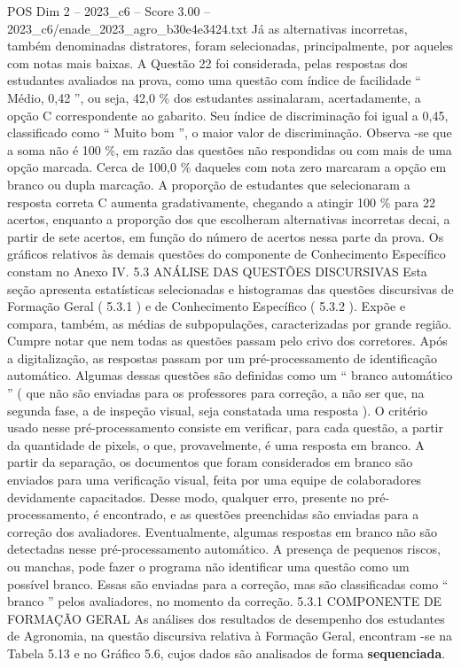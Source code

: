 \begin{textsample}{POS Dim 2 – 2023\_c6 – Score 3.00 – 2023\_c6/enade\_2023\_agro\_b30e4e3424.txt}
Já as alternativas incorretas, também denominadas distratores, foram selecionadas, principalmente, por aqueles com notas mais baixas.
A Questão 22 foi considerada, pelas respostas dos estudantes avaliados na prova, como uma questão com índice de facilidade “ Médio, 0,42 ”, ou seja, 42,0 \% dos estudantes assinalaram, acertadamente, a opção C correspondente ao gabarito.
Seu índice de discriminação foi igual a 0,45, classificado como “ Muito bom ”, o maior valor de discriminação.
Observa -se que a soma não é 100 \%, em razão das questões não respondidas ou com mais de uma opção marcada.
Cerca de 100,0 \% daqueles com nota zero marcaram a opção em branco ou dupla marcação.
A proporção de estudantes que selecionaram a resposta correta C aumenta gradativamente, chegando a atingir 100 \% para 22 acertos, enquanto a proporção dos que escolheram alternativas incorretas decai, a partir de sete acertos, em função do número de acertos nessa parte da prova.
Os gráficos relativos às demais questões do componente de Conhecimento Específico constam no Anexo IV. 5.3 ANÁLISE DAS QUESTÕES DISCURSIVAS Esta seção apresenta estatísticas selecionadas e histogramas das questões discursivas de Formação Geral ( 5.3.1 ) e de Conhecimento Específico ( 5.3.2 ).
Expõe e compara, também, as médias de subpopulações, caracterizadas por grande região.
Cumpre notar que nem todas as questões passam pelo crivo dos corretores.
Após a digitalização, as respostas passam por um pré-processamento de identificação automático.
Algumas dessas questões são definidas como um “ branco automático ” ( que não são enviadas para os professores para correção, a não ser que, na segunda fase, a de inspeção visual, seja constatada uma resposta ).
O critério usado nesse pré-processamento consiste em verificar, para cada questão, a partir da quantidade de pixels, o que, provavelmente, é uma resposta em branco.
A partir da separação, os documentos que foram considerados em branco são enviados para uma verificação visual, feita por uma equipe de colaboradores devidamente capacitados.
Desse modo, qualquer erro, presente no pré-processamento, é encontrado, e as questões preenchidas são enviadas para a correção dos avaliadores.
Eventualmente, algumas respostas em branco não são detectadas nesse pré-processamento automático.
A presença de pequenos riscos, ou manchas, pode fazer o programa não identificar uma questão como um possível branco.
Essas são enviadas para a correção, mas são classificadas como “ branco ” pelos avaliadores, no momento da correção. 5.3.1 COMPONENTE DE FORMAÇÃO GERAL As análises dos resultados de desempenho dos estudantes de Agronomia, na questão discursiva relativa à Formação Geral, encontram -se na Tabela 5.13 e no Gráfico 5.6, cujos dados são analisados de forma \textbf{sequenciada}.

\end{textsample}
